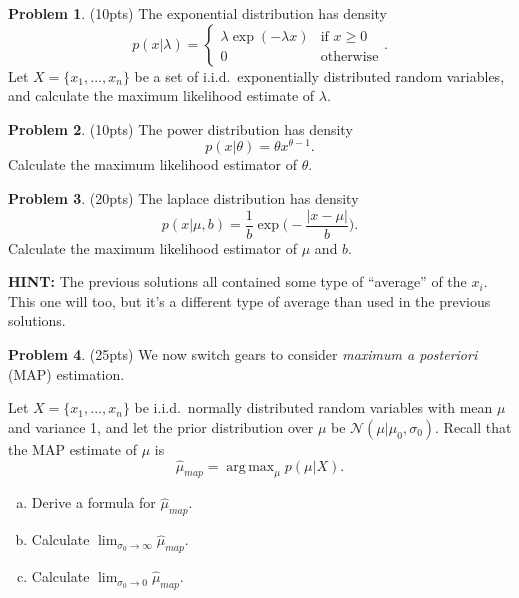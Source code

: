 \documentclass[10pt]{article}
\theoremstyle{definition}
\newtheorem{problem}{Problem}
\DeclareMathOperator*{\argmax}{arg\,max}
\newcommand{\map}[1]{\hat{#1}_{\textit{map}}}
\newcommand{\normal}{\mathcal{N}}
\begin{document}
\newpage
\begin{problem}
    (10pts) 
    The exponential distribution has density
    \begin{equation}
        p(x|\lambda) =
        \begin{cases}
            \lambda \exp(-\lambda x) & \text{if $x\ge0$} \\
            0 & \text{otherwise}
        \end{cases}
        .
    \end{equation}
    Let $X=\{x_1,...,x_n\}$ be a set of i.i.d.\ exponentially distributed random variables,
    and calculate the maximum likelihood estimate of $\lambda$.
\end{problem}

\newpage
\begin{problem}
    (10pts) 
    The power distribution has density
    \begin{equation}
        p(x|\theta) = \theta x^{\theta-1}
        .
    \end{equation}
    Calculate the maximum likelihood estimator of $\theta$.
\end{problem}

\newpage
\begin{problem}
    (20pts) 
    The laplace distribution has density
    \begin{equation}
        p(x|\mu,b) = \frac1b \exp\bigg(-\frac{|x-\mu|}{b}\bigg)
        .
    \end{equation}
    Calculate the maximum likelihood estimator of $\mu$ and $b$.

    \vspace{0.15in}
    \noindent
    \textbf{HINT:}
    The previous solutions all contained some type of ``average'' of the $x_i$.
    This one will too, but it's a different type of average than used in the previous solutions.
\end{problem}

\newpage
\begin{problem}
    (25pts)
    We now switch gears to consider \emph{maximum a posteriori} (MAP) estimation.

    Let $X=\{x_1,...,x_n\}$ be i.i.d.\ normally distributed random variables with mean $\mu$ and variance 1, and
    let the prior distribution over $\mu$ be $\normal(\mu|\mu_0,\sigma_0)$.
    Recall that the MAP estimate of $\mu$ is 
    \begin{equation}
        \map\mu = \argmax_\mu p(\mu|X)
        .
    \end{equation}
    \begin{enumerate}[(a)]
        \item Derive a formula for $\map\mu$.
        \vspace{5in}
        \item Calculate $\displaystyle\lim_{\sigma_0\to\infty}\map\mu$.
        \vspace{1in}
        \item Calculate $\displaystyle\lim_{\sigma_0\to0}\map\mu$.
    \end{enumerate}
\end{problem}
\end{document}
